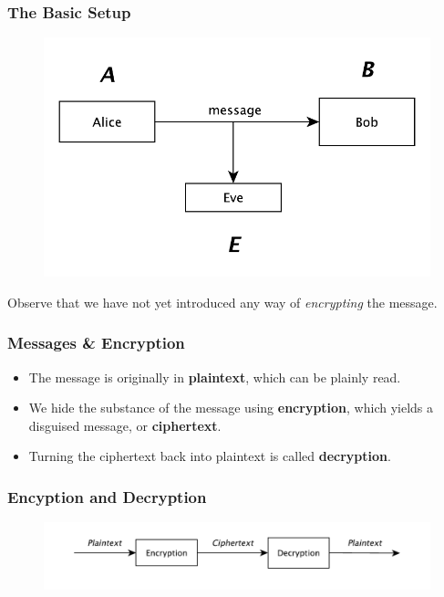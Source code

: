 \documentclass{beamer}
\newcommand{\<}{\langle}
\renewcommand{\>}{\rangle}
\begin{document}
\begin{frame}
\frametitle{The Basic Setup}

\begin{figure}
\includegraphics[scale=.8]{IMG/diag2.pdf}
\end{figure}


Observe that we have not yet introduced any way of \emph{encrypting} the message.
\end{frame}

\begin{frame}
\frametitle{Messages \& Encryption}

\begin{itemize}
\item The message is originally in \textbf{plaintext}, which can be plainly read.
\item We hide the substance of the message using \textbf{encryption}, which yields a disguised message, or \textbf{ciphertext}.
\item Turning the ciphertext back into plaintext is called \textbf{decryption}.
\end{itemize}
\end{frame}

\begin{frame}
\frametitle{Encyption and Decryption}
\begin{figure}
\includegraphics[scale=.5]{IMG/diag3.pdf}
\end{figure}
\end{frame}
\end{document}
